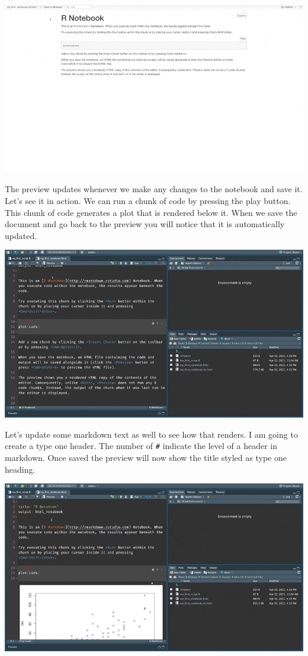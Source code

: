 \documentclass[
]{book}
\begin{document}
\includegraphics{assets/ch_2-notebooks/gifs/first_preview.gif}

The preview updates whenever we make any changes to the notebook and save it. Let's see it in action. We can run a chunk of code by pressing the play button. This chunk of code generates a plot that is rendered below it. When we save the document and go back to the preview you will notice that it is automatically updated.

\includegraphics{assets/ch_2-notebooks/gifs/preview_updates.gif}

Let's update some markdown text as well to see how that renders. I am going to create a type one header. The number of \texttt{\#} indicate the level of a header in markdown. Once saved the preview will now show the title styled as type one heading.

\includegraphics{assets/ch_2-notebooks/gifs/title_updates.gif}
\end{document}
